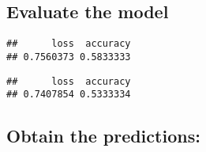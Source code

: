 \documentclass[
]{book}
\newenvironment{Shaded}{\begin{snugshade}}{\end{snugshade}}
\newcommand{\CommentTok}[1]{\textcolor[rgb]{0.56,0.35,0.01}{\textit{#1}}}
\newcommand{\DataTypeTok}[1]{\textcolor[rgb]{0.13,0.29,0.53}{#1}}
\newcommand{\DecValTok}[1]{\textcolor[rgb]{0.00,0.00,0.81}{#1}}
\newcommand{\FloatTok}[1]{\textcolor[rgb]{0.00,0.00,0.81}{#1}}
\newcommand{\KeywordTok}[1]{\textcolor[rgb]{0.13,0.29,0.53}{\textbf{#1}}}
\newcommand{\NormalTok}[1]{#1}
\newcommand{\OperatorTok}[1]{\textcolor[rgb]{0.81,0.36,0.00}{\textbf{#1}}}
\newcommand{\StringTok}[1]{\textcolor[rgb]{0.31,0.60,0.02}{#1}}
\begin{document}
\begin{Shaded}
\end{Shaded}

\hypertarget{evaluate-the-model}{%
\subsection{Evaluate the model}\label{evaluate-the-model}}

\begin{Shaded}
\end{Shaded}

\begin{verbatim}
##      loss  accuracy 
## 0.7560373 0.5833333
\end{verbatim}

\begin{Shaded}
\end{Shaded}

\begin{verbatim}
##      loss  accuracy 
## 0.7407854 0.5333334
\end{verbatim}

\hypertarget{obtain-the-predictions}{%
\subsection{Obtain the predictions:}\label{obtain-the-predictions}}
\end{document}
